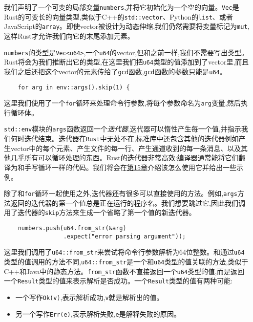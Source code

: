 我们声明了一个可变的局部变量\texttt{numbers},并将它初始化为一个空的向量。\texttt{Vec}是Rust的可变长的向量类型,类似于C++的\texttt{std::vector}、Python的\texttt{list}、或者JavaScript的\texttt{array}。即使vector被设计为动态伸缩,我们仍然需要将变量标记为\texttt{mut},这样Rust才允许我们向它的末尾添加元素。

\texttt{numbers}的类型是\texttt{Vec<u64>},一个\texttt{u64}的vector,但和之前一样,我们不需要写出类型。Rust将会为我们推断出它的类型,在这里我们把\texttt{u64}类型的值添加到了vector里,而且我们之后还把这个vector的元素传给了\texttt{gcd}函数,\texttt{gcd}函数的参数只能是\texttt{u64}。

\begin{verbatim}
    for arg in env::args().skip(1) {
\end{verbatim}

这里我们使用了一个\texttt{for}循环来处理命令行参数,将每个参数命名为\texttt{arg}变量,然后执行循环体。

\texttt{std::env}模块的\texttt{args}函数返回一个\emph{迭代器},迭代器可以惰性产生每一个值,并指示我们何时迭代结束。迭代器在\texttt{Rust}中无处不在,标准库中还包含其他的迭代器例如产生vector中的每个元素、产生文件的每一行、产生通道收到的每一条消息、以及其他几乎所有可以循环处理的东西。Rust的迭代器非常高效:编译器通常能将它们翻译为和手写循环一样的代码。我们将会在\hyperref[ch15]{第15章}介绍该怎么使用它并给出一些示例。

除了和\texttt{for}循环一起使用之外,迭代器还有很多可以直接使用的方法。例如,\texttt{args}方法返回的迭代器的第一个值总是正在运行的程序名。我们想要跳过它,因此我们调用了迭代器的\texttt{skip}方法来生成一个省略了第一个值的新迭代器。

\begin{verbatim}
    numbers.push(u64.from_str(&arg)
                 .expect("error parsing argument"));
\end{verbatim}

这里我们调用了\texttt{u64::from\_str}来尝试将命令行参数解析为64位整数。和通过\texttt{u64}类型的值调用的方法不同,\texttt{u64::from\_str}是一个和\texttt{u64}类型的值关联的方法,类似于C++和Java中的静态方法。\texttt{from\_str}函数不直接返回一个\texttt{u64}类型的值,而是返回一个\texttt{Result}类型的值来表示解析是否成功。一个\texttt{Result}类型的值有两种可能:

\begin{itemize}
    \item 一个写作\texttt{Ok(v)},表示解析成功,\texttt{v}就是解析出的值。
    \item 另一个写作\texttt{Err(e)},表示解析失败,\texttt{e}是解释失败的原因。
\end{itemize}

